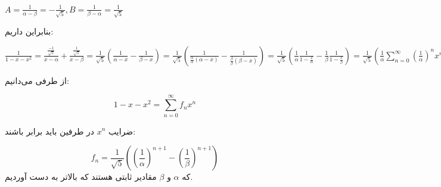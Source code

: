 \begin{PROBLEM}
{\begin{enumerate}
\begin{center}
                        
                        $A = \frac{1}{\alpha - \beta} = -\frac{1}{\sqrt{5}}, B = \frac{1}{\beta - \alpha} = \frac{1}{\sqrt{5}}$
                        

                    \end{center}
                    بنابراین داریم:
                    

                    \begin{center}
                        $\frac{1}{1 - x - x^2} = \frac{\frac{-1}{\sqrt{5}}}{x - \alpha} + \frac{\frac{1}{\sqrt{5}}}{x - \beta} 
                        = \frac{1}{\sqrt{5}}(\frac{1}{\alpha - x} - \frac{1}{\beta - x}) 
                        = \frac{1}{\sqrt{5}}(\frac{1}{ \frac{\alpha}{\alpha}(\alpha - x)} - \frac{1}{ \frac{\beta}{\beta}(\beta - x)})
                        = \frac{1}{\sqrt{5}}(\frac{1}{\alpha}\frac{1}{1 - \frac{x}{\alpha} } - \frac{1}{\beta}\frac{1}{1 - \frac{x}{\beta}}) 
                        = \frac{1}{\sqrt{5}}(\frac{1}{\alpha}\sum_{n = 0}^{\infty} (\frac{1}{\alpha})^nx^n - \frac{1}{\beta}\sum_{n = 0}^{\infty} (\frac{1}{\beta})^nx^n)
                        = \frac{1}{\sqrt{5}}(\sum_{n = 0}^{\infty} (\frac{1}{\alpha}^{n+1} - \frac{1}{\beta}^{n + 1})x^n)$
                    \end{center}
                    از طرفی می‌دانیم:
                    

                    
                    $$1 - x - x^2 = \sum_{n = 0}^{\infty} f_nx^n$$
                    
                    ضرایب $x^n$ در طرفین باید برابر باشند:
                    

                    $$f_n = \frac{1}{\sqrt{5}}( (\frac{1}{\alpha})^{n + 1} - (\frac{1}{\beta})^{n + 1}   )$$
                    که 
                    $\alpha$
                    و 
                    $\beta$
                    مقادیر ثابتی هستند که بالاتر به دست آوردیم.
    \end{enumerate}

    }
\end{PROBLEM}